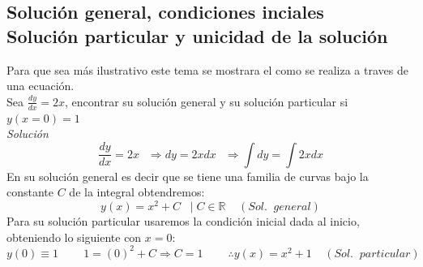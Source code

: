 \documentclass[10pt]{article}
\begin{document}
\subsection{Solución general, condiciones inciales\\Solución particular y unicidad de la solución}
Para que sea más ilustrativo este tema se mostrara el como se realiza a traves de una ecuación.\\
Sea $\frac{dy}{dx}=2x$, encontrar su solución general y su solución particular si $y(x=0)=1$
\\\textit{Solución}
\[\frac{dy}{dx}=2x\:\:\;\Rightarrow dy=2xdx\:\:\;\Rightarrow \int dy=\int 2xdx\]
En su solución general es decir que se tiene una familia de curvas bajo la constante $C$ de la integral obtendremos:
\[y(x)=x^{2}+C\;\;\;|\;C \in \mathbb{R}\;\;\;\;(Sol.\;\;general)\]
Para su solución particular usaremos la condición inicial dada al inicio, obteniendo lo siguiente con $x=0$:
\[y(0)\equiv 1 \;\;\;\;\;\;\;\;1=(0)^{2}+C \Rightarrow C=1\;\;\;\;\;\;\;\;\therefore y(x)=x^{2}+1\;\;\;\;(Sol.\;\;particular)\]
\end{document}
